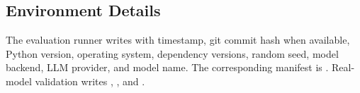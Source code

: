 \documentclass[11pt]{article}
\begin{document}
\subsection{Environment Details}
The evaluation runner writes  with timestamp, git commit hash when available, Python version, operating system, dependency versions, random seed, model backend, LLM provider, and model name. The corresponding manifest is . Real-model validation writes , , and .





\end{document}
